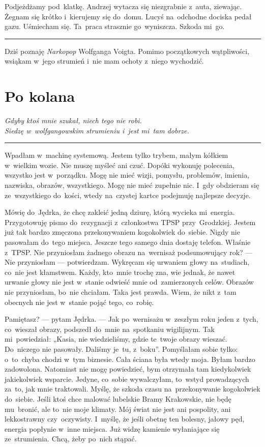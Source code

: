 \documentclass[9pt, a5paper]{memoir}
\begin{document}
Podjeżdżamy pod~klatkę. Andrzej wytacza się niezgrabnie z~auta, ziewając. Żegnam się krótko i~kierujemy się do~domu. Lucyś na~odchodne dociska pedał gazu. Uśmiecham się. Ta~praca strasznie go~wyniszcza. Szkoda mi~go.

\fancybreak{* \quad * \quad *}

Dziś poznaję \textit{Narkopop} Wolfganga Voigta. Pomimo początkowych wątpliwości, wsiąkam w~jego strumień i~nie mam ochoty z~niego wychodzić.

\newpage
\section{Po kolana}
{
\itshape
Gdyby ktoś mnie szukał, niech tego nie robi.\\
Siedzę w~wolfgangowskim strumieniu i~jest mi~tam dobrze.
}

\fancybreak{* \quad * \quad *}

Wpadłam w~machinę systemową. Jestem tylko trybem, małym kółkiem w~wielkim wozie. Nie muszę myśleć ani czuć. Dopóki wykonuję polecenia, wszystko jest w~porządku. Mogę nie mieć wizji, pomysłu, problemów, imienia, nazwiska, obrazów, wszystkiego. Mogę nie mieć zupełnie nic. I~gdy obdzieram się ze~wszystkiego do~kości, wtedy na~czystej kartce podejmuję najlepsze decyzje.

Mówię do~Jędrka, że chcę zakleić jedną dziurę, którą wycieka mi~energia. Przygotowuję pismo do~rezygnacji z~członkostwa TPSP przy~Grodzkiej. Jestem już tak bardzo zmęczona przekonywaniem kogokolwiek do~siebie. Nigdy nie pasowałam do~tego miejsca. Jeszcze tego samego dnia dostaję telefon. Właśnie z~TPSP. Nie przyniosłam żadnego obrazu na~wernisaż podsumowujący rok? --- Nie przyniosłam --- potwierdzam. Wykręcam się urwaniem głowy na~studiach, co~nie jest kłamstwem. Każdy, kto~mnie trochę zna, wie jednak, że nawet urwanie głowy nie jest w~stanie odwieść mnie od~zamierzonych celów. Obrazów nie przyniosłam, bo~nie chciałam. Taka jest prawda. Wiem, że nikt z~tam obecnych nie jest w~stanie pojąć tego, co~robię.

Pamiętasz? --- pytam Jędrka. --- Jak po~wernisażu w~zeszłym roku jeden z~tych, co~wieszał obrazy, podszedł do~mnie na~spotkaniu wigilijnym. Tak mi~powiedział: „Kasia, nie wiedzieliśmy, gdzie te~twoje obrazy wieszać. Do~niczego nie pasowały. Daliśmy je~tu, z~boku”. Pomyślałam sobie tylko: o~to~chyba chodzi w~tym biznesie. Cała ściana była wtedy moja. Byłam bardzo zadowolona. Natomiast nie mogę powiedzieć, bym otrzymała tam kiedykolwiek jakiekolwiek wsparcie. Jedyne, co~sobie wywalczyłam, to~wstyd prowadzących za~to, jak mnie traktowali. Myślę, że szkoda czasu na~przekonywanie kogokolwiek do~siebie. Jeśli ktoś chce malować lubelskie Bramy Krakowskie, nie będę mu~bronić, ale to~nie moje klimaty. Mój świat nie jest ani pospolity, ani lekkostrawny czy~oczywisty. I~myślę, że jeśli obetnę ten bolesny, jałowy pęd, energia popłynie w~inne miejsca. Już widzę kamienie wyłaniające się ze~strumienia. Chcą, żeby po~nich stąpać.
\end{document}
